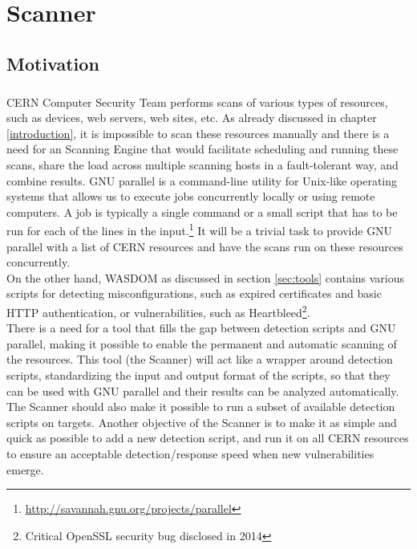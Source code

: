 \chapter{Scanner}
\label{chap4-scanner}
\thispagestyle{empty}

\section{Motivation}
\label{scanner_motivation}
\paragraph{}

CERN Computer Security Team performs scans of various types of resources, such as devices, web servers, web sites, etc. As already discussed in chapter \ref{introduction}, it is impossible to scan these resources manually and there is a need for an Scanning Engine that would facilitate scheduling and running these scans, share the load across multiple scanning hosts in a fault-tolerant way, and combine results.
GNU parallel is a command-line utility for Unix-like operating systems that allows us to execute jobs concurrently locally or using remote computers. A job is typically a single command or a small script that has to be run for each of the lines in the input.\footnote{\url{http://savannah.gnu.org/projects/parallel}} It will be a trivial task to provide GNU parallel with a list of CERN resources and have the scans run on these resources concurrently.
\\ 
On the other hand, WASDOM as discussed in section \ref{sec:tools} contains various scripts for detecting misconfigurations, such as expired certificates and basic HTTP authentication, or vulnerabilities, such as Heartbleed\footnote{Critical OpenSSL security bug disclosed in 2014}. 
\\
There is a need for a tool that fills the gap between detection scripts and GNU parallel, making it possible to enable the permanent and automatic scanning of the resources. This tool (the Scanner) will act like a wrapper around detection scripts, standardizing the input and output format of the scripts, so that they can be used with GNU parallel and their results can be analyzed automatically. The Scanner should also make it possible to run a subset of available detection scripts on targets. Another objective of the Scanner is to make it as simple and quick as possible to add a new detection script, and run it on all CERN resources to ensure an acceptable detection/response speed when new vulnerabilities emerge.

